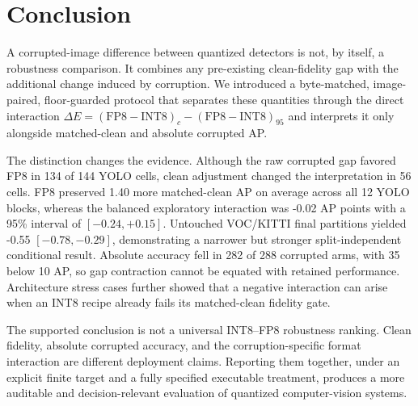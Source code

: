 \section{Conclusion}
\label{sec:conclusion}

A corrupted-image difference between quantized detectors is not, by itself, a
robustness comparison. It combines any pre-existing clean-fidelity gap with the
additional change induced by corruption. We introduced a byte-matched,
image-paired, floor-guarded protocol that separates these quantities through the
direct interaction
$\Delta E=(\mathrm{FP8}-\mathrm{INT8})_c-
(\mathrm{FP8}-\mathrm{INT8})_{95}$ and interprets it only alongside matched-clean
and absolute corrupted AP.

The distinction changes the evidence. Although the raw corrupted gap favored
FP8 in 134 of 144 YOLO cells, clean adjustment changed the interpretation in 56
cells. FP8 preserved 1.40 more matched-clean AP on average across all 12 YOLO
blocks, whereas the balanced exploratory interaction was -0.02 AP points with a
95\% interval of $[-0.24,+0.15]$. Untouched VOC/KITTI final partitions yielded
-0.55 $[-0.78,-0.29]$, demonstrating a narrower but stronger split-independent
conditional result. Absolute accuracy fell in 282 of 288 corrupted arms, with
35 below 10 AP, so gap contraction cannot be equated with retained performance.
Architecture stress cases further showed that a negative interaction can arise
when an INT8 recipe already fails its matched-clean fidelity gate.

The supported conclusion is not a universal INT8--FP8 robustness ranking.
Clean fidelity, absolute corrupted accuracy, and the corruption-specific format
interaction are different deployment claims. Reporting them together, under an
explicit finite target and a fully specified executable treatment, produces a
more auditable and decision-relevant evaluation of quantized computer-vision
systems.
